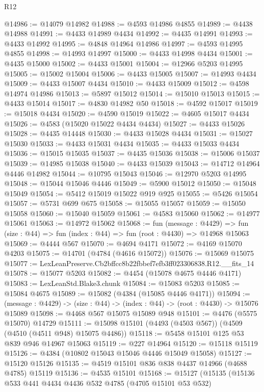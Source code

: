 \begin{lexlean}{R12}
\begin{coremodule}
@14986 := @14079 @14982
@14988 := @4593 @14986 @4855
@14989 := @4438 @14988
@14991 := @4433 @14989 @4434
@14992 := @4435 @14991
@14993 := @4433 @14992
@14995 := @4848 @14964 @14986
@14997 := @4593 @14995 @4855
@14998 := @14993 @14997
@15000 := @4433 @14998 @4434
@15001 := @4435 @15000
@15002 := @4433 @15001
@15004 := @12966 @5203 @14995
@15005 := @15002 @15004
@15006 := @4433 @15005
@15007 := @14993 @4434
@15009 := @4433 @15007 @4434
@15010 := @4433 @15009
@15012 := @4598 @14974 @14986
@15013 := @5897 @15012
@15014 := @15010 @15013
@15015 := @4433 @15014
@15017 := @4830 @14982 @50
@15018 := @4592 @15017
@15019 := @15018 @4434
@15020 := @4590 @15019
@15022 := @4605 @15017 @4434
@15026 := @4583 (@15020 @15022 @4434 @4434)
@15027 := @4433 @15026
@15028 := @4435 @14448
@15030 := @4433 @15028 @4434
@15031 := @15027 @15030
@15033 := @4433 @15031 @4434
@15035 := @4433 @15033 @4434
@15036 := @15015 @15035
@15037 := @4435 @15036
@15038 := @15006 @15037
@15039 := @14985 @15038
@15040 := @4433 @15039
@15043 := @14712 @14964 @4446 @14982
@15044 := @10795 @15043
@15046 := @12970 @5203 @14995
@15048 := @15044 @15046 @4446
@15049 := @5900 @15012
@15050 := @15048 @15049
@15054 := @5412 @15019 @15022 @919 @925
@15055 := @5426 @15054
@15057 := @5731 @699 @675
@15058 := @15055 @15057
@15059 := @15050 @15058
@15060 := @15040 @15059
@15061 := @4583 @15060
@15062 := @14977 @15061
@15063 := @14972 @15062
@15068 := fun (message : @4429) =>
  fun (size : @44) => fun (index : @44) => fun (root : @4430) => @14968 @15063
@15069 := @4444 @567
@15070 := @4694 @4171
@15072 := @4169 @15070 @4203
@15075 := @14701 (@4784 (@4616 @15072))
@15076 := @15069 @15075
@15077 := LexLeanPreserve.Cb2bffcc8b22fbbef7efb3ff023306838.R12.__fits_14
@15078 := @15077 @5203
@15082 := @4454 (@15078 @4675 @4446 @4171)
@15083 := LexLeanStd.Blake3.chunk
@15084 := @15083 @5203
@15085 := @15084 @4675
@15089 := @15082 (@4384 (@15085 @4446 @4171))
@15094 := (message : @4429) -> (size : @44) -> (index : @44) -> (root : @4430) -> @15076 @15089
@15098 := @4468 @567 @15075 @15089 @948
@15101 := @4476 (@5575 @15070) @14729
@15111 := @15098 @15101 (@4493 (@4503 @567)) (@4509 (@4510 (@4511 @948) @15075 @4486))
@15118 := @5458 @15101 @125 @53 @839 @946 @14967 @15063
@15119 := @227 @14964
@15120 := @15118 @15119
@15126 := @4384 (@10802 @15043 @15046 @4446 @15049 @15058)
@15127 := @15120 @15126
@15135 := @4519 @15101 @836 @838 @4437 @14966 (@4688 @4785) @15119
@15136 := @4535 @15101
@15168 := @15127
    (@15135
      (@15136
        @533
        @441
        @4434
        @4436
        @532
        @4785
        (@4705 @15101 @53 @532)

\end{coremodule}
\end{lexlean}
